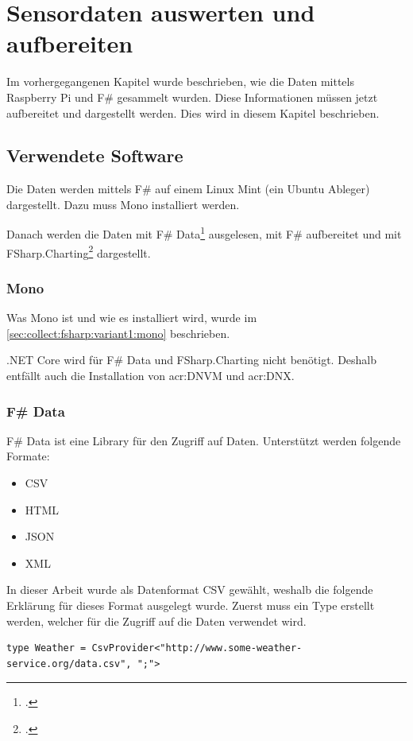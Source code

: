 
\chapter{Sensordaten auswerten und aufbereiten}
Im vorhergegangenen Kapitel wurde beschrieben, wie die Daten mittels Raspberry Pi und F\# gesammelt wurden. Diese Informationen müssen jetzt aufbereitet und dargestellt werden. Dies wird in diesem Kapitel beschrieben.


\section{Verwendete Software}
\label{sec:display:software}
Die Daten werden mittels F\# auf einem Linux Mint (ein Ubuntu Ableger) dargestellt. Dazu muss Mono installiert werden. 

Danach werden die Daten mit F\# Data\footcite{FShaprp_Data_2016-06-17} ausgelesen, mit F\# aufbereitet und mit FSharp.Charting\footcite{FSharp_Charting_2016-06-17} dargestellt.

\subsection{Mono}
Was Mono ist und wie es installiert wird, wurde im \cref{sec:collect:fsharp:variant1:mono}  beschrieben.

.NET Core wird für F\# Data und FSharp.Charting nicht benötigt. Deshalb entfällt auch die Installation von \gls{acr:DNVM} und \gls{acr:DNX}. 

\subsection{F\# Data}
\label{sec:display:software:fsharpdata}
F\# Data ist eine Library für den Zugriff auf Daten. Unterstützt werden folgende Formate:
\begin{itemize}
\item CSV
\item HTML
\item JSON
\item XML
\end{itemize}

In dieser Arbeit wurde als Datenformat CSV gewählt, weshalb die folgende Erklärung für dieses Format ausgelegt wurde.
Zuerst muss ein Type erstellt werden, welcher für die Zugriff auf die Daten verwendet wird.
\begin{lstlisting}
type Weather = CsvProvider<"http://www.some-weather-service.org/data.csv", ";">
\end{lstlisting}

